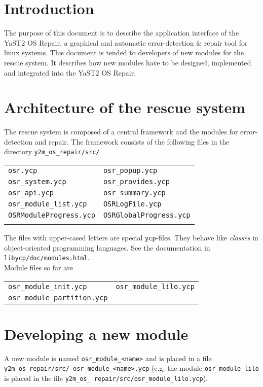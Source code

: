 \section{Introduction}
The purpose of this document is to describe the application interface
of the YaST2 OS Repair, a graphical and automatic error-detection \& repair
tool for linux systems. This document is tended to developers of new modules
for the rescue system. It describes how new modules have to be designed,
implemented and integrated into the YaST2 OS Repair.

\section{Architecture of the rescue system}
The rescue system is composed of a central framework and the modules for
error-detection and repair. The framework consists of the following files
in the directory \verb+y2m_os_repair/src/+\\

\begin{tabular}{p{5cm}p{5cm}}
\verb+osr.ycp+               & \verb+osr_popup.ycp+\\
\verb+osr_system.ycp+        & \verb+osr_provides.ycp+\\
\verb+osr_api.ycp+           & \verb+osr_summary.ycp+\\
\verb+osr_module_list.ycp+   & \verb+OSRLogFile.ycp+\\
\verb+OSRModuleProgress.ycp+ & \verb+OSRGlobalProgress.ycp+\\\\
\end{tabular}

The files with upper-cased letters are special \verb+ycp+-files. They behave
like {\em classes} in object-oriented programming languages. See the
documentation in \verb+libycp/doc/modules.html+.\\

Module files so far are\\

\begin{tabular}{p{5cm}p{5cm}}
\verb+osr_module_init.ycp+ & \verb+osr_module_lilo.ycp+\\
\verb+osr_module_partition.ycp+ & \\
\end{tabular}

\section{Developing a new module}
A new module is named \verb+osr_module_<name>+ and is placed in a file
{\tt y2m\_os\_repair/src/ osr\_module\_<name>.ycp} (e.g. the module
\verb+osr_module_lilo+ is placed in the file 
{\tt y2m\_os\_ repair/src/osr\_module\_lilo.ycp}).\\

